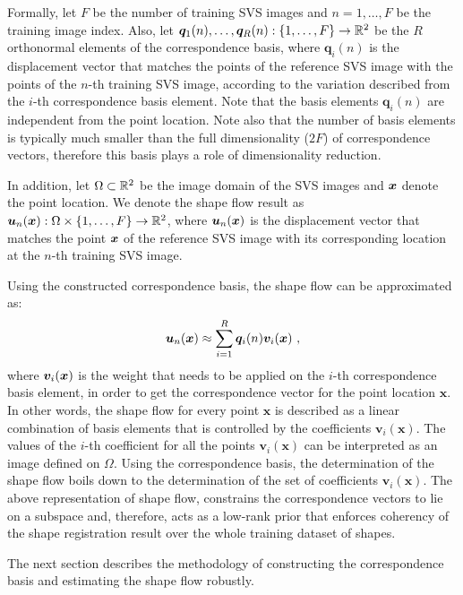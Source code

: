Formally, let $F$ be the number of training SVS images and $n=1,\ldots,F$ be the training image index. Also, let $\boldsymbol{q}_1(n),\ldots,\boldsymbol{q}_R(n):
\{1,\ldots,F\} \rightarrow \mathbb{R}^2$ be the $R$ orthonormal elements of the correspondence basis, where $\boldsymbol{q}_i(n)$ is the displacement vector that matches the points of the reference SVS image with the points of the $n$-th training SVS image, according to the variation described from the $i$-th correspondence basis element. Note that the basis elements $\boldsymbol{q}_i(n)$ are independent from the point location. Note also that the number of basis elements is typically much smaller than the full dimensionality ($2 F$) of correspondence vectors, therefore this basis plays a role of dimensionality reduction.


In addition, let $\Omega \subset \mathbb{R}^2$ be the image domain of the SVS images and $\boldsymbol{x}$ denote the point location. We denote the shape flow result as $\bm{u}_n(\boldsymbol{x}):\Omega\times \{1,\ldots,F\}
\rightarrow \mathbb{R}^2$,  where $\bm{u}_n(\boldsymbol{x})$ is the displacement vector that matches the point $\boldsymbol{x}$ of the reference SVS image with its corresponding location at the $n$-th training SVS image.

Using the constructed correspondence basis, the shape flow can be approximated as:
\begin{equation}\label{eq:LinTrajModel}
    \bm{u}_n(\boldsymbol{x}) \approx
    \sum_{i=1}^R\bm{q}_i(n)\bm{v}_i(\boldsymbol{x}) \,\, ,
\end{equation}
where $\bm{v}_i(\boldsymbol{x})$ is the weight that needs to be applied on the $i$-th correspondence basis element, in order to get the correspondence vector for the point location $\bm{x}$. In other words, the shape flow for every point $\bm{x}$ is described as a linear combination of basis elements that is controlled by the coefficients $\bm{v}_i(\bm{x})$.
The values of the $i$-th coefficient for all the points $\bm{v}_i(\bm{x})$ can be interpreted as an image defined on $\Omega$. Using the correspondence basis, the determination of the shape flow boils down to the determination of the set of coefficients $\bm{v}_i(\bm{x})$. The above representation of shape flow, constrains the correspondence vectors to lie on a subspace and, therefore, acts as a low-rank prior that enforces coherency of the shape registration result over the whole training dataset of shapes.


The next section describes the methodology of constructing the correspondence basis and estimating the shape flow robustly.

